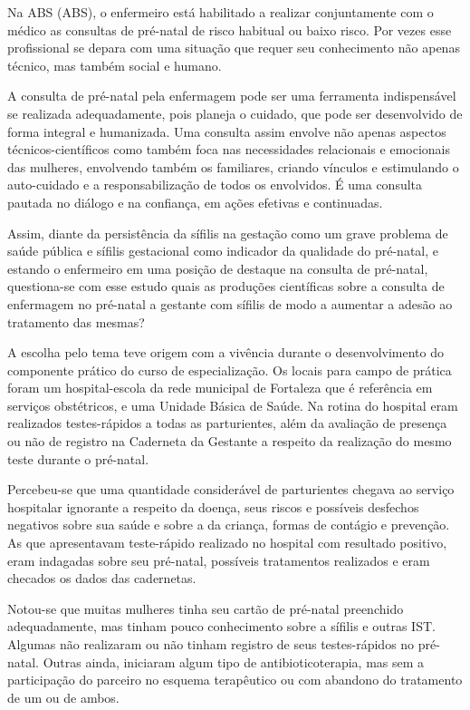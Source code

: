 Na \acrlong{ABS} (\acrshort{ABS}), o enfermeiro está habilitado a realizar conjuntamente com o médico as consultas de pré-natal de risco habitual ou baixo risco. Por vezes esse profissional se depara com uma situação que requer seu conhecimento não apenas técnico, mas também social e humano.

A consulta de pré-natal pela enfermagem pode ser uma ferramenta indispensável se realizada adequadamente, pois planeja o cuidado, que pode ser desenvolvido de forma integral e humanizada. Uma consulta assim envolve não apenas aspectos técnicos-científicos como também foca nas necessidades relacionais e emocionais das mulheres, envolvendo também os familiares, criando vínculos e estimulando o auto-cuidado e a responsabilização de todos os envolvidos. É uma consulta pautada no diálogo e na confiança, em ações efetivas e continuadas. \cite{rodrigues2016elementos}

Assim, diante da persistência da sífilis na gestação como um grave problema de saúde pública e  sífilis gestacional como indicador da qualidade do pré-natal, e estando o enfermeiro em uma posição de destaque na consulta de pré-natal, questiona-se com esse estudo quais as produções científicas sobre a consulta de enfermagem no pré-natal a gestante com sífilis de modo a aumentar a adesão ao tratamento das mesmas?

A escolha pelo tema teve origem com a vivência durante o desenvolvimento do componente prático do curso de especialização. Os locais para campo de prática foram um hospital-escola da rede municipal de Fortaleza que é referência em serviços obstétricos, e uma Unidade Básica de Saúde. Na rotina do hospital eram realizados testes-rápidos a todas as parturientes, além da avaliação de presença ou não de registro na Caderneta da Gestante a respeito da realização do mesmo teste durante o pré-natal.

Percebeu-se que uma quantidade considerável de parturientes chegava ao serviço hospitalar ignorante a respeito da doença, seus riscos e possíveis desfechos negativos sobre sua saúde e sobre a da criança, formas de contágio e prevenção. As que apresentavam teste-rápido realizado no hospital com resultado positivo, eram indagadas sobre seu pré-natal, possíveis tratamentos realizados e eram checados os dados das cadernetas. 

Notou-se que muitas mulheres tinha seu cartão de pré-natal preenchido adequadamente, mas tinham pouco conhecimento sobre a sífilis e outras \acrshort{IST}. Algumas não realizaram ou não tinham registro de seus testes-rápidos no pré-natal. Outras ainda, iniciaram algum tipo de antibioticoterapia, mas sem a participação do parceiro no esquema terapêutico ou com abandono do tratamento de um ou de ambos.


